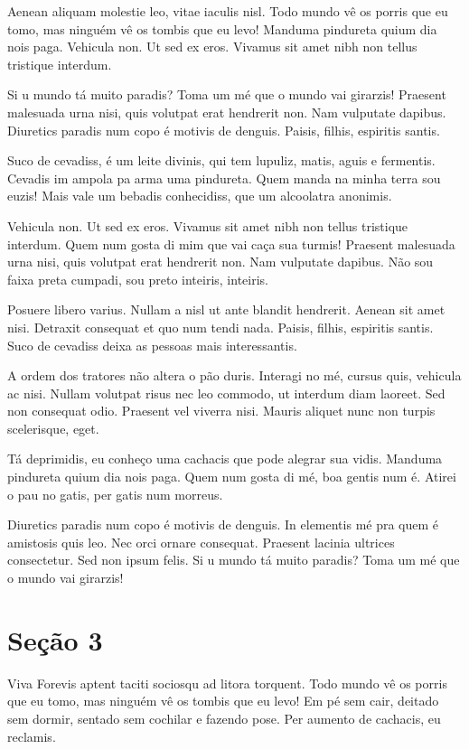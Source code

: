 \documentclass{article}
\begin{document}
	Aenean aliquam molestie leo, vitae iaculis nisl. Todo mundo vê os porris que eu tomo, mas ninguém vê os tombis que eu levo! Manduma pindureta quium dia nois paga. Vehicula non. Ut sed ex eros. Vivamus sit amet nibh non tellus tristique interdum.
	
	Si u mundo tá muito paradis? Toma um mé que o mundo vai girarzis! Praesent malesuada urna nisi, quis volutpat erat hendrerit non. Nam vulputate dapibus. Diuretics paradis num copo é motivis de denguis. Paisis, filhis, espiritis santis.
	
	Suco de cevadiss, é um leite divinis, qui tem lupuliz, matis, aguis e fermentis. Cevadis im ampola pa arma uma pindureta. Quem manda na minha terra sou euzis! Mais vale um bebadis conhecidiss, que um alcoolatra anonimis.
	
	Vehicula non. Ut sed ex eros. Vivamus sit amet nibh non tellus tristique interdum. Quem num gosta di mim que vai caça sua turmis! Praesent malesuada urna nisi, quis volutpat erat hendrerit non. Nam vulputate dapibus. Não sou faixa preta cumpadi, sou preto inteiris, inteiris.
	
	Posuere libero varius. Nullam a nisl ut ante blandit hendrerit. Aenean sit amet nisi. Detraxit consequat et quo num tendi nada. Paisis, filhis, espiritis santis. Suco de cevadiss deixa as pessoas mais interessantis.
	
	A ordem dos tratores não altera o pão duris. Interagi no mé, cursus quis, vehicula ac nisi. Nullam volutpat risus nec leo commodo, ut interdum diam laoreet. Sed non consequat odio. Praesent vel viverra nisi. Mauris aliquet nunc non turpis scelerisque, eget.
	
	Tá deprimidis, eu conheço uma cachacis que pode alegrar sua vidis. Manduma pindureta quium dia nois paga. Quem num gosta di mé, boa gentis num é. Atirei o pau no gatis, per gatis num morreus.
	
	Diuretics paradis num copo é motivis de denguis. In elementis mé pra quem é amistosis quis leo. Nec orci ornare consequat. Praesent lacinia ultrices consectetur. Sed non ipsum felis. Si u mundo tá muito paradis? Toma um mé que o mundo vai girarzis!
	
	\section{Seção 3}
	
	Viva Forevis aptent taciti sociosqu ad litora torquent. Todo mundo vê os porris que eu tomo, mas ninguém vê os tombis que eu levo! Em pé sem cair, deitado sem dormir, sentado sem cochilar e fazendo pose. Per aumento de cachacis, eu reclamis.  
	
\end{document}
